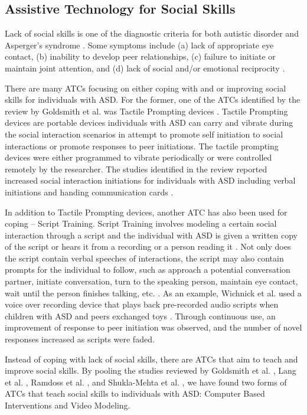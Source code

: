\subsection{Assistive Technology for Social Skills}
Lack of social skills is one of the diagnostic criteria for both autistic disorder and Asperger's syndrome \cite{spitzer1980diagnostic}.  Some symptoms include (a) lack of appropriate eye contact, (b) inability to develop peer relationships, (c) failure to initiate or maintain joint attention, and (d) lack of social and/or emotional reciprocity \cite{rao2008social}.

There are many ATCs focusing on either coping with and or improving social skills for individuals with ASD.  For the former, one of the ATCs identified by the review by Goldsmith et al. was Tactile Prompting devices \cite{goldsmith2004use}.  Tactile Prompting devices are portable devices individuals with ASD can carry and vibrate during the social interaction scenarios in attempt to promote self initiation to social interactions or promote responses to peer initiations.  The tactile prompting devices were either programmed to vibrate periodically or were controlled remotely by the researcher.  The studies identified in the review reported increased social interaction initiations for individuals with ASD including verbal initiations \cite{shabani2002increasing, taylor1998teaching} and handing communication cards \cite{taylor2004teaching}.

In addition to Tactile Prompting devices, another ATC has also been used for coping -- Script Training.  Script Training involves modeling a certain social interaction through a script and the individual with ASD is given a written copy of the script or hears it from a recording or a person reading it \cite{stevenson2000social}.  Not only does the script contain verbal speeches of interactions, the script may also contain prompts for the individual to follow, such as approach a potential conversation partner, initiate conversation, turn to the speaking person, maintain eye contact, wait until the person finishes talking, etc. \cite{wichnick2010effect}.  As an example, Wichnick et al. used a voice over recording device that plays back pre-recorded audio scripts when children with ASD and peers exchanged toys \cite{wichnick2010effect}.  Through continuous use, an improvement of response to peer initiation was observed, and the number of novel responses increased as scripts were faded.

Instead of coping with lack of social skills, there are ATCs that aim to teach and improve social skills.  By pooling the studies reviewed by Goldsmith et al. \cite{goldsmith2004use}, Lang et al. \cite{lang2014assistive}, Ramdoss et al. \cite{ramdoss2012computer}, and  Shukla-Mehta et al. \cite{shukla2009evaluating}, we have found two forms of ATCs that teach social skills to individuals with ASD: Computer Based Interventions and Video Modeling.

